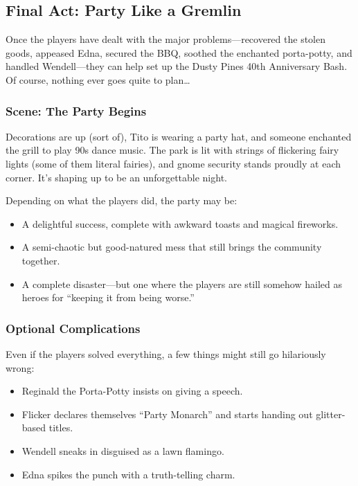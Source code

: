 \subsection{Final Act: Party Like a Gremlin}

Once the players have dealt with the major problems—recovered the stolen goods, appeased Edna, secured the BBQ, soothed the enchanted porta-potty, and handled Wendell—they can help set up the Dusty Pines 40th Anniversary Bash. Of course, nothing ever goes quite to plan…

\subsubsection{Scene: The Party Begins}

Decorations are up (sort of), Tito is wearing a party hat, and someone enchanted the grill to play 90s dance music. The park is lit with strings of flickering fairy lights (some of them literal fairies), and gnome security stands proudly at each corner. It’s shaping up to be an unforgettable night.

Depending on what the players did, the party may be:
\begin{itemize}
    \item A delightful success, complete with awkward toasts and magical fireworks.
    \item A semi-chaotic but good-natured mess that still brings the community together.
    \item A complete disaster—but one where the players are still somehow hailed as heroes for “keeping it from being worse.”
\end{itemize}

\subsubsection{Optional Complications}
Even if the players solved everything, a few things might still go hilariously wrong:
\begin{itemize}
    \item Reginald the Porta-Potty insists on giving a speech.
    \item Flicker declares themselves “Party Monarch” and starts handing out glitter-based titles.
    \item Wendell sneaks in disguised as a lawn flamingo.
    \item Edna spikes the punch with a truth-telling charm.
\end{itemize}

